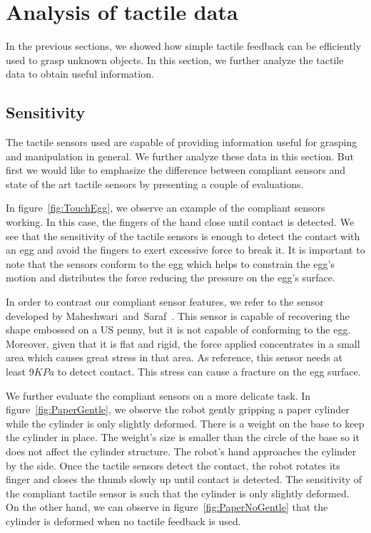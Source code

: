 \section{Analysis of tactile data}
\label{sec:imp:analysis}

In the previous sections, we showed how simple tactile feedback
can be efficiently used to grasp unknown objects. In this section,
we further analyze the tactile data to obtain useful information.


\subsection{Sensitivity}

The tactile sensors used are capable of providing information
useful for grasping and manipulation in general. We further
analyze these data in this section. But first we would like to
emphasize the difference between compliant sensors and state of
the art tactile sensors by presenting a couple of evaluations.

In figure~\ref{fig:TouchEgg}, we observe an example of the
compliant sensors working. In this case, the fingers of the hand
close until contact is detected. We see that the sensitivity of
the tactile sensors is enough to detect the contact with an egg
and avoid the fingers to exert excessive force to break it. It is
important to note that the sensors conform to the egg which helps
to constrain the egg's motion and distributes the force reducing
the pressure on the egg's surface.

In order to contrast our compliant sensor features, we refer to
the sensor developed by
Maheshwari~and~Saraf~\cite{touchsensorScience}. This sensor is
capable of recovering the shape embossed on a US penny, but it is
not capable of conforming to the egg. Moreover, given that it is
flat and rigid, the force applied concentrates in a small area
which causes great stress in that area. As reference, this sensor
needs at least $9KPa$ to detect contact. This stress can cause a
fracture on the egg surface.

We further evaluate the compliant sensors on a more delicate task.
In figure~\ref{fig:PaperGentle}, we observe the robot gently
gripping a paper cylinder while the cylinder is only slightly
deformed. There is a weight on the base to keep the cylinder in
place. The weight's size is smaller than the circle of the base so
it does not affect the cylinder structure. The robot's hand
approaches the cylinder by the side. Once the tactile sensors
detect the contact, the robot rotates its finger and closes the
thumb slowly up until contact is detected. The sensitivity of the
compliant tactile sensor is such that the cylinder is only
slightly deformed. On the other hand, we can observe in
figure~\ref{fig:PaperNoGentle} that the cylinder is deformed when
no tactile feedback is used.

